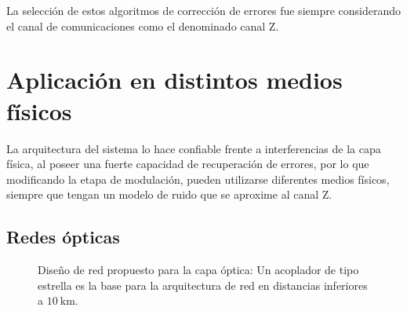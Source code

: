 La selección de estos algoritmos de corrección de errores fue siempre considerando el canal de comunicaciones como el denominado canal Z. %

\section{Aplicación en distintos medios físicos}
La arquitectura del sistema lo hace confiable frente a interferencias de la capa física, al poseer una fuerte capacidad de recuperación de errores, por lo que modificando la etapa de modulación, pueden utilizarse diferentes medios físicos, siempre que tengan un modelo de ruido que se aproxime al canal Z.
\subsection{Redes ópticas}


\begin{figure}[t]
  \centering
    \qquad
    \caption{Diseño de red propuesto para la capa óptica: Un acoplador de tipo estrella es la base para la arquitectura de red en distancias inferiores a $10~\mathrm{km}$.}
    \label{arch:fig1}
\end{figure}



